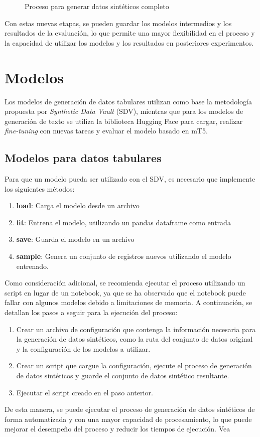 \begin{figure}[H]
	\centering
	
	\caption{Proceso para generar datos sintéticos completo}
	\label{process-sdv-2}
\end{figure}

Con estas nuevas etapas, se pueden guardar los modelos intermedios y los resultados de la evaluación, lo que permite una mayor flexibilidad en el proceso y la capacidad de utilizar los modelos y los resultados en posteriores experimentos.



\section{Modelos}

Los modelos de generación de datos tabulares utilizan como base la metodología propuesta por \emph{Synthetic Data Vault} (SDV), mientras que para los modelos de generación de texto se utiliza la biblioteca Hugging Face para cargar, realizar \emph{fine-tuning} con nuevas tareas y evaluar el modelo basado en mT5.

\subsection{Modelos para datos tabulares}
Para que un modelo pueda ser utilizado con el SDV, es necesario que implemente los siguientes métodos:
\begin{enumerate}
    \item \textbf{load}: Carga el modelo desde un archivo
    \item \textbf{fit}: Entrena el modelo, utilizando un pandas dataframe como entrada
    \item \textbf{save}: Guarda el modelo en un archivo
    \item \textbf{sample}: Genera un conjunto de registros nuevos utilizando el modelo entrenado.
\end{enumerate}

Como consideración adicional, se recomienda ejecutar el proceso utilizando un script en lugar de un notebook, ya que se ha observado que el notebook puede fallar con algunos modelos debido a limitaciones de memoria. A continuación, se detallan los pasos a seguir para la ejecución del proceso:
\begin{enumerate}
\item Crear un archivo de configuración que contenga la información necesaria para la generación de datos sintéticos, como la ruta del conjunto de datos original y la configuración de los modelos a utilizar.
\item Crear un script que cargue la configuración, ejecute el proceso de generación de datos sintéticos y guarde el conjunto de datos sintético resultante.
\item Ejecutar el script creado en el paso anterior.
\end{enumerate}
De esta manera, se puede ejecutar el proceso de generación de datos sintéticos de forma automatizada y con una mayor capacidad de procesamiento, lo que puede mejorar el desempeño del proceso y reducir los tiempos de ejecución. Vea 

